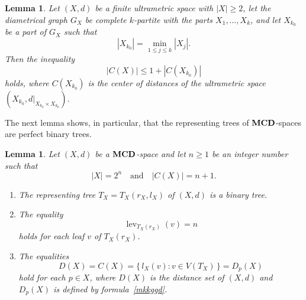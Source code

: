 \documentclass{raex}
\newtheorem{lem}[thm]{Lemma}
\theoremstyle{definition}
\theoremstyle{remark}
\numberwithin{equation}{section}
\begin{document}
\begin{lem} \label{kvcr}
Let $(X,d)$ be a finite ultrametric space with $|X|\geq 2$, let the diametrical graph $G_X$ be complete $k$-partite with the parts $X_1,\ldots,X_k$,
and let $X_{k_0}$ be a part of $G_X$ such that
\[
|X_{k_0}|=\min\limits_{1\leq j\leq k}|X_j|.
\]
Then the inequality
\[
|C(X)| \leq 1+|C(X_{k_0})|
\]
holds, where 
$C(X_{k_0})$ is the center of distances of the ultrametric space 
$(X_{k_0}, d|_{X_{k_0}\times X_{k_0}})$.
\end{lem}


The next lemma shows, in particular, that the representing trees of ${\bf MCD}$-spaces are perfect binary  trees.


\begin{lem} \label{UT2Lemma3}
Let $(X,d)$ be a ${\bf MCD}$-space and let $n \geq 1$ be an integer number such that 
\begin{equation}
    \label{fl}
|X|=2^n
\quad\text{and}\quad
|C(X)|=n+1.
\end{equation}
\begin{enumerate}
\item[(i)]  The representing tree
\(
T_{ X}=T_{ X}(r_{ X},l_{ X})
\)
of $( X,d)$ is a binary tree.

\item[(ii)]  The equality
\begin{equation*}
\operatorname{lev}_{T_X(r_X)}(v)=n
\end{equation*}
holds for each leaf $v$ of $T_{ X}(r_X)$.

\item[(iii)] The equalities
\begin{equation}
    \label{o1}
D(X)=C(X)=\{\,l_X(v):v\in V(T_X)\,\}=D_p(X)
\end{equation}
hold for each \(p\in X\),
where $D( X)$ is the distance set of $( X,d)$ and
$D_p( X)$ is defined by formula~\eqref{mkkggd}.
\end{enumerate}
\end{lem}
\end{document}
